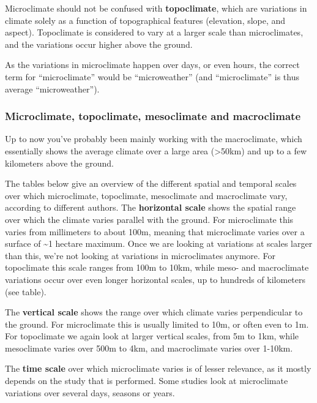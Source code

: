 \documentclass[12pt,oneside]{book}
\begin{document}
Microclimate should not be confused with \textbf{topoclimate}, which are
variations in climate solely as a function of topographical features
(elevation, slope, and aspect). Topoclimate is considered to vary at a
larger scale than microclimates, and the variations occur higher above
the ground.

As the variations in microclimate happen over days, or even hours, the
correct term for ``microclimate'' would be ``microweather'' (and
``microclimate'' is thus average ``microweather'').

\subsubsection{Microclimate, topoclimate, mesoclimate and
macroclimate}\label{microclimate-topoclimate-mesoclimate-and-macroclimate}

Up to now you've probably been mainly working with the macroclimate,
which essentially shows the average climate over a large area
(\textgreater{}50km) and up to a few kilometers above the ground.

The tables below give an overview of the different spatial and temporal
scales over which microclimate, topoclimate, mesoclimate and
macroclimate vary, according to different authors. The
\textbf{horizontal scale} shows the spatial range over which the climate
varies parallel with the ground. For microclimate this varies from
millimeters to about 100m, meaning that microclimate varies over a
surface of \textasciitilde{}1 hectare maximum. Once we are looking at
variations at scales larger than this, we're not looking at variations
in microclimates anymore. For topoclimate this scale ranges from 100m to
10km, while meso- and macroclimate variations occur over even longer
horizontal scales, up to hundreds of kilometers (see table).

The \textbf{vertical scale} shows the range over which climate varies
perpendicular to the ground. For microclimate this is usually limited to
10m, or often even to 1m. For topoclimate we again look at larger
vertical scales, from 5m to 1km, while mesoclimate varies over 500m to
4km, and macroclimate varies over 1-10km.

The \textbf{time scale} over which microclimate varies is of lesser
relevance, as it mostly depends on the study that is performed. Some
studies look at microclimate variations over several days, seasons or
years.
\end{document}
